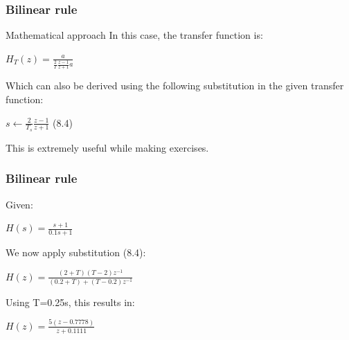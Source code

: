 \begin{frame}
	\frametitle{Bilinear rule}
	\begin{block}{Mathematical approach}
		In this case, the transfer function is:
		\begin{center}
			$H_T(z) = \frac{a}{\frac{2}{T}\frac{z-1}{z+1}a }$
		\end{center}
		Which can also be derived using the following substitution in the given transfer function:
		\begin{center}
			$s \gets \frac{2}{T_s} \frac{z-1}{z+1}$ (8.4)
		\end{center}
		This is extremely useful while making exercises.
	\end{block}
\end{frame}

\begin{frame}
	\frametitle{Bilinear rule}
	\begin{example}
		Given:
		\begin{center}
			$H(s) = \frac{s + 1}{0.1s + 1}$
		\end{center}
		We now apply substitution (8.4):
		\begin{center}
			$H(z) = \frac{(2 + T)(T - 2)z^{-1}}{(0.2 + T) + (T - 0.2)z^{-1}}$
		\end{center}
		Using T=0.25s, this results in:
		\begin{center}
			$H(z) = \frac{5(z - 0.7778)}{z + 0.1111}$
		\end{center}
	\end{example}
\end{frame}

